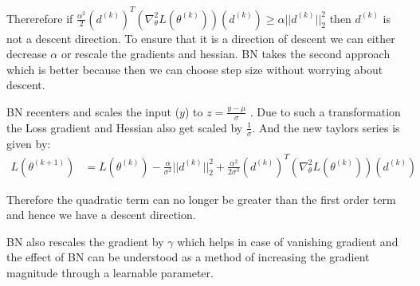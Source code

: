 \documentclass[11pt]{article}
\begin{document}
Thererefore if $ \frac{\alpha^2}{2}( d^{(k)})^T (\nabla_{\theta}^2 L(\theta^{(k)}) )(d^{(k)} )\geq\alpha||d^{(k)}||^2_2 $ then $d^{(k)}$ is not a descent direction. To ensure that it is a direction of descent we can either decrease $\alpha$ or rescale the gradients and hessian. BN takes the second approach which is better because then we can choose step size without worrying about descent. 

BN recenters and scales the input ($y$) to $z= \frac{y-\mu}{\sigma}$ . Due to such a transformation the Loss gradient and Hessian also get scaled by $\frac{1}{\sigma}$. And the new taylors series is given by:
\begin{align*}
L(\theta^{(k+1)})&= L(\theta^{(k)}) - \frac{\alpha}{\sigma^2}||d^{(k)}||^2_2  +\frac{\alpha^2}{2\sigma^3}( d^{(k)})^T (\nabla_{\theta}^2 L(\theta^{(k)}) )(d^{(k)} )
\end{align*}

Therefore the quadratic term can no longer be greater than the first order term and hence we have a descent direction.

\vspace{2ex}
BN also rescales the gradient by $\gamma$ which helps in case of vanishing gradient and the effect of BN can be understood as a method of increasing the gradient magnitude through a learnable parameter. 
\end{document}
